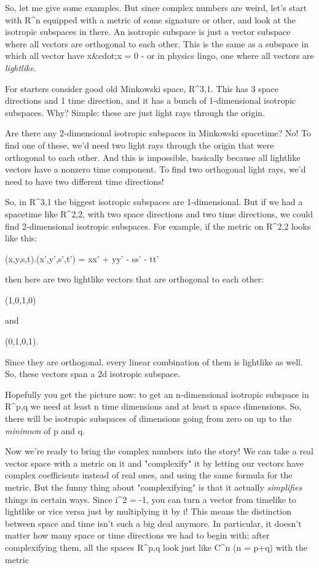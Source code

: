 So, let me give some examples.  But since complex numbers are weird, let's
start with R^{n} 
equipped with a metric of some signature or other, and look
at the isotropic subspaces in there.  An isotropic subspace is just a
vector subspace where all vectors are orthogonal to each other.  This
is the same as a subspace in which all vector have x&cdot;x = 0 - or in 
physics lingo, one where all vectors are \emph{lightlike}.


For starters consider good old Minkowski space, R^{3,1}.  This has 3
space directions and 1 time direction, and it has a bunch of 1-dimensional
isotropic subspaces.  Why?  Simple: these are just light rays through the 
origin.


Are there any 2-dimensional isotropic subspaces in Minkowski spacetime?
No!  To find one of these, we'd need two light rays through the origin
that were orthogonal to each other.  And this is impossible, basically
because all lightlike vectors have a nonzero time component.  To find
two orthogonal light rays, we'd need to have two different time directions!


So, in R^{3,1} the biggest isotropic subspaces are 1-dimensional.
But if we had a spacetime like R^{2,2}, with two space directions
and two time directions, we could find 2-dimensional isotropic subspaces.
For example, if the metric on R^{2,2} looks like this:


(x,y,s,t).(x',y',s',t') = xx' + yy' - ss' - tt'


then here are two lightlike vectors that are orthogonal to each
other:


(1,0,1,0)


and


(0,1,0,1).


Since they are orthogonal, every linear combination of them is
lightlike as well.   So, these vectors span a 2d isotropic subspace.


Hopefully you get the picture now: to get an n-dimensional isotropic
subspace in R^{p,q} we need at least n time dimensions and at least
n space dimensions.  So, there will be isotropic subspaces of dimensions
going from zero on up to the \emph{minimum} of p and q.


Now we're ready to bring the complex numbers into the story!
We can take a real vector space with a metric on it and "complexify"
it by letting our vectors have complex coefficients instead of real
ones, and using the same formula for the metric.  But the funny thing 
about "complexifying" is that it actually \emph{simplifies} things in 
certain ways.  Since i^{2} = -1, you can turn a vector from timelike
to lightlike or vice versa just by multiplying it by i!  This means
the distinction between space and time isn't such a big deal anymore.
In particular, it doesn't matter how many space or time directions we 
had to begin with; after complexifying them, all the spaces R^{p,q} 
look just like C^{n} (n = p+q) with the metric 


